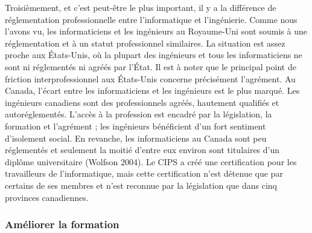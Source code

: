 {{\item [][---] Troisièmement, et c'est peut-être le plus important, il y a la différence de réglementation professionnelle entre l'informatique et l'ingénierie. Comme nous l'avons vu, les informaticiens et les ingénieurs au Royaume-Uni sont soumis à une réglementation et à un statut professionnel similaires. La situation est assez proche aux États-Unis, où la plupart des ingénieurs et tous les informaticiens ne sont ni réglementés ni agréés par l'État. Il est à noter que le principal point de friction interprofessionnel aux États-Unis concerne précisément l'agrément. Au Canada, l'écart entre les informaticiens et les ingénieurs est le plus marqué. Les ingénieurs canadiens sont des professionnels agréés, hautement qualifiés et autoréglementés. L'accès à la profession est encadré par la législation, la formation et l'agrément ; les ingénieurs bénéficient d'un fort sentiment d'isolement social. En revanche, les informaticiens au Canada sont peu réglementés et seulement la moitié d'entre eux environ sont titulaires d'un diplôme universitaire (Wolfson 2004). Le CIPS a créé une certification pour les travailleurs de l’informatique, mais cette certification n’est détenue que par certains de ses membres et n’est reconnue par la législation que dans cinq provinces canadiennes.
}{\cite{adams_interprofessional_2007}}
\vspace{-1\baselineskip}
}{}

\subsubsection{Améliorer la formation}


